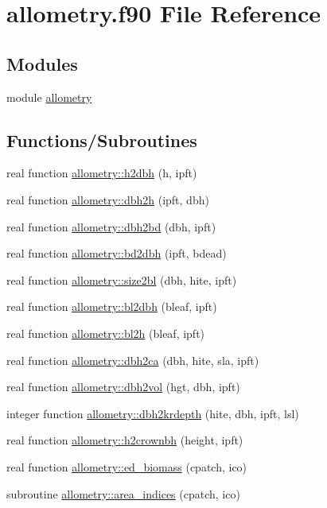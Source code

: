 \hypertarget{allometry_8f90}{}\section{allometry.\+f90 File Reference}
\label{allometry_8f90}
\subsection*{Modules}
\begin{DoxyCompactItemize}
\item 
module \hyperlink{namespaceallometry}{allometry}
\end{DoxyCompactItemize}
\subsection*{Functions/\+Subroutines}
\begin{DoxyCompactItemize}
\item 
real function \hyperlink{namespaceallometry_a31aa8db06e86ec74efb5e692417399df}{allometry\+::h2dbh} (h, ipft)
\item 
real function \hyperlink{namespaceallometry_a56f11dc07da4d5e7114dc37d6cc5f2cc}{allometry\+::dbh2h} (ipft, dbh)
\item 
real function \hyperlink{namespaceallometry_a76db2bc4aaa47db1e2656117ec476dba}{allometry\+::dbh2bd} (dbh, ipft)
\item 
real function \hyperlink{namespaceallometry_a50fedbee3a14eb5569a62abb4a36198f}{allometry\+::bd2dbh} (ipft, bdead)
\item 
real function \hyperlink{namespaceallometry_a45ced9bf9ccd03debe8def35b579f4bd}{allometry\+::size2bl} (dbh, hite, ipft)
\item 
real function \hyperlink{namespaceallometry_a3236375dc165a26aeea2d97c7e2c2685}{allometry\+::bl2dbh} (bleaf, ipft)
\item 
real function \hyperlink{namespaceallometry_a59a1fc10140498dee62fce8a641da254}{allometry\+::bl2h} (bleaf, ipft)
\item 
real function \hyperlink{namespaceallometry_abacdf8e8e585ce8d788a1fc2be133243}{allometry\+::dbh2ca} (dbh, hite, sla, ipft)
\item 
real function \hyperlink{namespaceallometry_aab2b2cee61cac31529246b043121c7de}{allometry\+::dbh2vol} (hgt, dbh, ipft)
\item 
integer function \hyperlink{namespaceallometry_ac1523ea0e0ef8d2dd6a429f61a013c1c}{allometry\+::dbh2krdepth} (hite, dbh, ipft, lsl)
\item 
real function \hyperlink{namespaceallometry_a88949ed487fccc2f1dfd065399043b0d}{allometry\+::h2crownbh} (height, ipft)
\item 
real function \hyperlink{namespaceallometry_ab6a3d3302db0096b21354babe768677b}{allometry\+::ed\+\_\+biomass} (cpatch, ico)
\item 
subroutine \hyperlink{namespaceallometry_ac715c0d308392f2b0eee93ab9ae210b1}{allometry\+::area\+\_\+indices} (cpatch, ico)
\end{DoxyCompactItemize}
